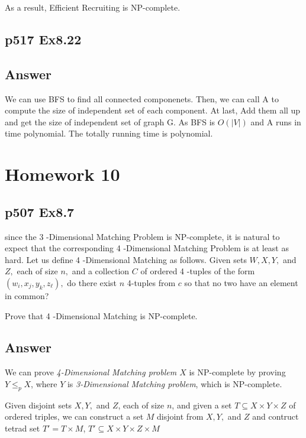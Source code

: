 \documentclass[a4paper]{article}
\begin{document}
As a result, Efficient Recruiting is NP-complete.
\vspace{2cm}

\subsection*{p517 Ex8.22}
\subsection*{Answer}
We can use BFS to find all connected componenets. Then, we can call A to compute the size of independent set of each component. At last, Add them all up and get the size of independent set of graph G. As BFS is $O(|V|)$ and A runs in time polynomial. The totally running time is polynomial.





\newpage
\section*{Homework 10}
\subsection*{p507 Ex8.7}
\begin{adjustwidth}{1cm}{1cm}
	since the 3 -Dimensional Matching Problem is NP-complete, it is natural to expect that the corresponding 4 -Dimensional Matching Problem is at least as hard. Let us define 4 -Dimensional Matching as follows. Given sets $W, X, Y,$ and $Z,$ each of size $n,$ and a collection $C$ of ordered 4 -tuples of the form $\left(w_{i}, x_{j}, y_{k}, z_{\ell}\right),$ do there exist $n$ 4-tuples from $c$ so that no two have an element in common?

	Prove that 4 -Dimensional Matching is NP-complete.
\end{adjustwidth}
\subsection*{Answer}
We can prove  \emph{4-Dimensional Matching problem $X$} is NP-complete by proving $Y\leq_pX$, where $Y$ is \emph{3-Dimensional Matching problem}, which is NP-complete.

Given disjoint sets $X, Y,$ and $Z$, each of size $n$, and given a set $T \subseteq X \times Y \times Z$ of ordered triples, we can construct a set $M$ disjoint from $X, Y,$ and $Z$ and contruct tetrad set $T' = T \times M$, $T' \subseteq X \times Y \times Z \times M$
\end{document}
